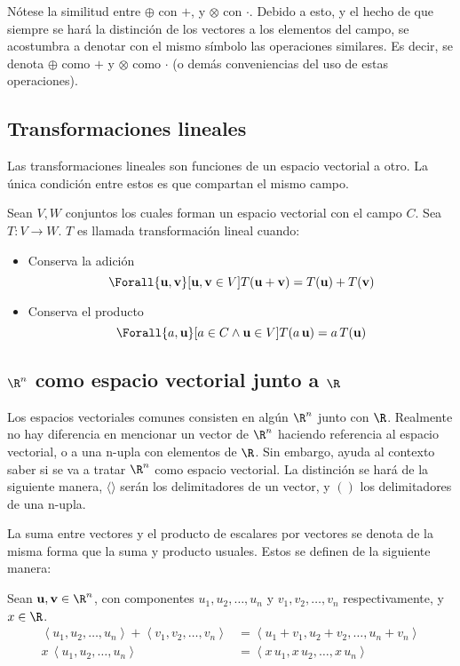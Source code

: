 Nótese la similitud entre $\oplus$ con $+$, y $\otimes$ con $\cdot$. Debido a esto,
y el hecho de que siempre se hará la distinción de los vectores a los elementos
del campo, se acostumbra a denotar con el mismo símbolo las operaciones similares. Es decir,
se denota $\oplus$ como $+$ y $\otimes$ como $\cdot$ (o demás conveniencias del uso de estas
operaciones).

\subsection{Transformaciones lineales}

Las transformaciones lineales son funciones de un espacio vectorial a otro.
La única condición entre estos es que compartan el mismo campo.

Sean $V,W$ conjuntos los cuales forman un espacio vectorial con el campo $C$. Sea
$T: V \to W$. $T$ es llamada transformación lineal cuando:

\begin{itemize}
  \item Conserva la adición
  \[
    \Forall{\mathbf{u},\mathbf{v}}[
      \mathbf{u},\mathbf{v} \in V
    ]{
      T(\mathbf{u} + \mathbf{v}) = T(\mathbf{u}) + T(\mathbf{v})
    }
  \]
  \item Conserva el producto
  \[
    \Forall{a,\mathbf{u}}[a \in C \land \mathbf{u} \in V]{
      T(a\,\mathbf{u}) = a\,T(\mathbf{u})
    }
  \]
\end{itemize}

\subsection{\texorpdfstring{$\R^n$}{Rn} como espacio vectorial junto a \texorpdfstring{$\R$}{R}}

Los espacios vectoriales comunes consisten en algún $\R^n$ junto con $\R$. Realmente
no hay diferencia en mencionar un vector de $\R^n$ haciendo referencia al espacio vectorial,
o a una n-upla con elementos de $\R$. Sin embargo, ayuda al contexto saber si se va a
tratar $\R^n$ como espacio vectorial. La distinción se hará de la siguiente manera,
$\langle \rangle$ serán los delimitadores de un vector, y $()$ los delimitadores de una n-upla.

La suma entre vectores y el producto de escalares por vectores se denota de la misma
forma que la suma y producto usuales. Estos se definen de la siguiente manera:

Sean $\mathbf{u},\mathbf{v}\in\R^n$, con componentes
$u_1,u_2,\dots,u_n$ y $v_1,v_2,\dots,v_n$ respectivamente, y $x\in\R$.
\begin{align*}
  \left<u_1,u_2,\dots,u_n\right> + \left<v_1,v_2,\dots,v_n\right>
  &=
  \left<u_1 + v_1, u_2  + v_2,\dots,u_n + v_n\right>\\
  x\,\left<u_1,u_2,\dots,u_n\right> &= \left<x\,u_1,x\,u_2,\dots,x\,u_n\right>
\end{align*}


